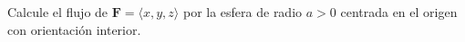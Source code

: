 ﻿Calcule el flujo de $\mathbf F=\langle x,y,z\rangle$ por la esfera de radio $a>0$ centrada en el origen con orientación interior.
